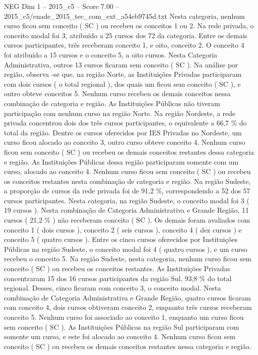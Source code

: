 \begin{textsample}{NEG Dim 1 – 2015\_c5 – Score 7.00 – 2015\_c5/enade\_2015\_tec\_com\_ext\_a54eb9745d.txt}
Nesta categoria, nenhum curso ficou sem conceito ( SC ) ou recebeu os conceitos 1 ou 2.
Na rede privada, o conceito modal foi 3, atribuído a 25 cursos dos 72 da categoria.
Entre os demais cursos participantes, três receberam conceito 1, e oito, conceito 2.
O conceito 4 foi atribuído a 15 cursos e o conceito 5, a oito cursos.
Nesta Categoria Administrativa, outros 13 cursos ficaram sem conceito ( SC ).
Na análise por região, observa -se que, na região Norte, as Instituições Privadas participaram com dois cursos ( o total regional ), dos quais um ficou sem conceito ( SC ), e outro obteve conceitos 5.
Nenhum curso recebeu os demais conceitos nessa combinação de categoria e região.
As Instituições Públicas não tiveram participação com nenhum curso na região Norte.
Na região Nordeste, a rede privada concentrou dois dos três cursos participantes, o equivalente a 66,7 \% do total da região.
Dentre os cursos oferecidos por IES Privadas no Nordeste, um curso ficou alocado ao conceito 3, outro curso obteve conceito 4.
Nenhum curso ficou sem conceito ( SC ) ou recebeu os demais conceitos restantes dessa categoria e região.
As Instituições Públicas dessa região participaram somente com um curso, alocado ao conceito 4.
Nenhum curso ficou sem conceito ( SC ) ou recebeu os conceitos restantes nesta combinação de categoria e região.
Na região Sudeste, a proporção de cursos da rede privada foi de 91,2 \%, correspondendo a 52 dos 57 cursos participantes.
Nesta categoria, na região Sudeste, o conceito modal foi 3 ( 19 cursos ).
Nesta combinação de Categoria Administrativa e Grande Região, 11 cursos ( 21,2 \% ) não receberam conceito ( SC ).
Os demais foram avaliados com conceito 1 ( dois cursos ), conceito 2 ( seis cursos ), conceito 4 ( dez cursos ) e conceito 5 ( quatro cursos ).
Entre os cinco cursos oferecidos por Instituições Públicas na região Sudeste, o conceito modal foi 4 ( quatro cursos ), e um curso recebeu o conceito 5.
Na região Sudeste, nesta categoria, nenhum curso ficou sem conceito ( SC ) ou recebeu os conceitos restantes.
As Instituições Privadas concentraram 15 dos 16 cursos participantes da região Sul, 93,8 \% do total regional.
Desses, cinco ficaram com conceito 3, o conceito modal.
Nesta combinação de Categoria Administrativa e Grande Região, quatro cursos ficaram com conceito 4, dois cursos obtiveram conceito 2, enquanto três cursos receberam conceito 5.
Nenhum curso foi associado ao conceito 1, enquanto um curso ficou sem conceito ( SC ).
As Instituições Públicas na região Sul participaram com somente um curso, e este foi alocado ao conceito 4.
Nenhum curso ficou sem conceito ( SC ) ou recebeu os demais conceitos restantes nessa categoria e região.

\end{textsample}
